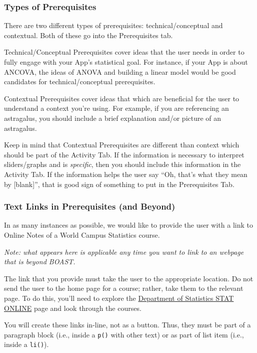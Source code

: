 \documentclass[
]{book}
\begin{document}
\hypertarget{types-of-prerequisites}{%
\subsubsection{Types of Prerequisites}\label{types-of-prerequisites}}

There are two different types of prerequisites: technical/conceptual and contextual. Both of these go into the Prerequisites tab.

Technical/Conceptual Prerequisites cover ideas that the user needs in order to fully engage with your App's statistical goal. For instance, if your App is about ANCOVA, the ideas of ANOVA and building a linear model would be good candidates for technical/conceptual prerequisites.

Contextual Prerequisites cover ideas that which are beneficial for the user to understand a context you're using. For example, if you are referencing an astragalus, you should include a brief explanation and/or picture of an astragalus.

Keep in mind that Contextual Prerequisites are different than context which should be part of the Activity Tab. If the information is necessary to interpret sliders/graphs and is \emph{specific}, then you should include this information in the Activity Tab. If the information helps the user say ``Oh, that's what they mean by {[}blank{]}'', that is good sign of something to put in the Prerequisites Tab.

\hypertarget{text-links-in-prerequisites-and-beyond}{%
\subsubsection{Text Links in Prerequisites (and Beyond)}\label{text-links-in-prerequisites-and-beyond}}

In as many instances as possible, we would like to provide the user with a link to Online Notes of a World Campus Statistics course.

\emph{Note: what appears here is applicable any time you want to link to an webpage that is beyond BOAST.}

The link that you provide must take the user to the appropriate location. Do not send the user to the home page for a course; rather, take them to the relevant page. To do this, you'll need to explore the \href{https://online.stat.psu.edu/statprogram/}{Department of Statistics STAT ONLINE} page and look through the courses.

You will create these links in-line, not as a button. Thus, they must be part of a paragraph block (i.e., inside a \texttt{p()} with other text) or as part of list item (i.e., inside a \texttt{li()}).
\end{document}
